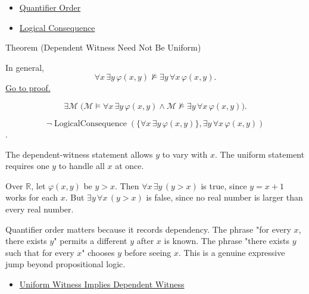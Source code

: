 \begin{dependencies}
\begin{itemize}
  \item \hyperref[def:q-alt]{Quantifier Order}
  \item \hyperref[def:log-consequence]{Logical Consequence}
\end{itemize}
\end{dependencies}

\begin{theorembox}{Theorem (Dependent Witness Need Not Be Uniform)}
\begin{theorem}
\label{thm:dependent-witness-not-uniform}
In general,
\[
\forall x\,\exists y\,\varphi(x,y)
\not\models
\exists y\,\forall x\,\varphi(x,y).
\]
\hyperref[prf:dependent-witness-not-uniform]{Go to proof.}
\end{theorem}
\end{theorembox}

\begin{remark*}
\[
\exists \mathcal M\;
\bigl(
\mathcal M\models\forall x\,\exists y\,\varphi(x,y)
\land
\mathcal M\not\models\exists y\,\forall x\,\varphi(x,y)
\bigr).
\]
\end{remark*}

\begin{remark*}
\[
\neg\operatorname{LogicalConsequence}(\{\forall x\,\exists y\,\varphi(x,y)\},
\exists y\,\forall x\,\varphi(x,y))
\].
\end{remark*}

\begin{remark*}[Interpretation]
The dependent-witness statement allows \(y\) to vary with \(x\). The uniform
statement requires one \(y\) to handle all \(x\) at once.
\end{remark*}

\begin{remark*}[Exposition]
Over \(\mathbb R\), let \(\varphi(x,y)\) be \(y>x\). Then
\(\forall x\,\exists y\,(y>x)\) is true, since \(y=x+1\) works for each \(x\).
But \(\exists y\,\forall x\,(y>x)\) is false, since no real number is larger
than every real number.
\end{remark*}

\begin{remark*}[Exposition]
Quantifier order matters because it records dependency. The phrase "for every
\(x\), there exists \(y\)" permits a different \(y\) after \(x\) is known. The
phrase "there exists \(y\) such that for every \(x\)" chooses \(y\) before
seeing \(x\). This is a genuine expressive jump beyond propositional logic.
\end{remark*}

\begin{dependencies}
\begin{itemize}
  \item \hyperref[thm:uniform-witness-implies-dependent-witness]{Uniform Witness Implies Dependent Witness}
\end{itemize}
\end{dependencies}
